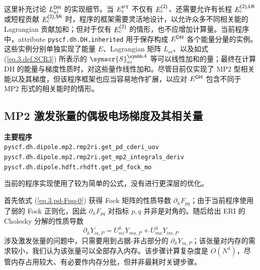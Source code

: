 这里补充讨论 $L_{ai}^{\textsf{DH}}$ 的实现细节。当 $E_\mathrm{c}^{\textsf{PT}}$ 不仅有 $E_\mathrm{c}^{\textsf{(2)}}$、还需要允许有长程 $E_\mathrm{c}^{\textsf{(2)}, \textsf{LR}}$ 或短程贡献 $E_\mathrm{c}^{\textsf{(2)}, \textsf{SR}}$ 时，程序的框架需要灵活地设计，以允许众多不同相关能的 Lagrangian 贡献加和；但对于仅有 $E_\mathrm{c}^{\textsf{(2)}}$ 的情形，也不应增加计算量。当前程序中，attribute \verb|pyscf.dh.DH.inherited| 用于保存构成 $E^{\textsf{DH}}$ 各个能量分量的实例。这些实例分别单独实现了能量 $E$、Lagrangian 矩阵 $L_{ai}$、以及如式 (\ref{eq.3.def.SCR3}) 所表示的 $\symscr{S}_{ai}^\mathbb{A}$ 等可以线性加和的量；最终在计算 DH 的能量与梯度性质时，对这些量作线性加和。尽管目前仅实现了 MP2 型相关能以及其梯度，但该程序框架也应当容易地作扩展，以应对 $E^{\textsf{DH}}$ 包含不同于 MP2 形式的相关能时的情形。

\subsection{MP2 激发张量的偶极电场梯度及其相关量}

\begin{tcolorbox}
    \textbf{主要程序}\\
    \verb|pyscf.dh.dipole.mp2.rmp2ri.get_pd_cderi_uov|\\
    \verb|pyscf.dh.dipole.mp2.rmp2ri.get_mp2_integrals_deriv|\\
    \verb|pyscf.dh.dipole.hdft.rhdft.get_pd_fock_mo|
\end{tcolorbox}

当前的程序实现使用了较为简单的公式，没有进行更深层的优化。

首先依式 (\ref{eq.3.pd-Fpq-0}) 获得 Fock 矩阵的性质导数 $\partial_\mathbb{A} F_{pq}$；由于当前程序使用了弱的 Fock 正则化，因此 $\partial_\mathbb{A} F_{pq}$ 对指标 $p, q$ 并非是对角的。随后给出 ERI 的 Cholesky 分解的性质导数
\begin{equation}
    \partial_\mathbb{A} Y_{ia, P} = U_{mi}^\mathbb{A} Y_{ma, P} + U_{ma}^\mathbb{A} Y_{im, P}
\end{equation}
涉及激发张量的问题中，只需要用到占据-非占部分的 $\partial_\mathbb{A} Y_{ia, P}$；该张量对内存的需求较小，我们认为该张量可以全部存入内存。该步骤计算复杂度是 $O(N^4)$，尽管内存占用较大、有必要作内存分批，但并非最耗时关键步骤。

